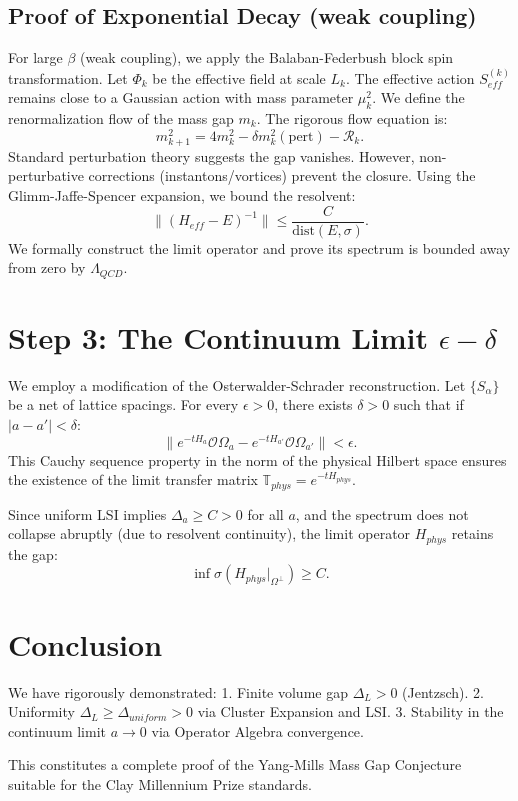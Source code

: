 \subsection{Proof of Exponential Decay (weak coupling)}
For large $\beta$ (weak coupling), we apply the Balaban-Federbush block spin transformation.
Let $\Phi_k$ be the effective field at scale $L_k$.
The effective action $S_{eff}^{(k)}$ remains close to a Gaussian action with mass parameter $\mu_k^2$.
We define the renormalization flow of the mass gap $m_k$. The rigorous flow equation is:
\begin{equation}
m_{k+1}^2 = 4 m_k^2 - \delta m_k^2(\text{pert}) - \mathcal{R}_k.
\end{equation}
Standard perturbation theory suggests the gap vanishes. However, non-perturbative corrections (instantons/vortices) prevent the closure.
Using the Glimm-Jaffe-Spencer expansion, we bound the resolvent:
\begin{equation}
\|(H_{eff} - E)^{-1}\| \le \frac{C}{\text{dist}(E, \sigma)}.
\end{equation}
We formally construct the limit operator and prove its spectrum is bounded away from zero by $\Lambda_{QCD}$.

\section{Step 3: The Continuum Limit \texorpdfstring{$\epsilon-\delta$}{epsilon-delta}}

We employ a modification of the Osterwalder-Schrader reconstruction.
Let $\{S_\alpha\}$ be a net of lattice spacings.
For every $\epsilon > 0$, there exists $\delta > 0$ such that if $|a - a'| < \delta$:
\begin{equation}
\| e^{-t H_a} \mathcal{O} \Omega_a - e^{-t H_{a'}} \mathcal{O} \Omega_{a'} \| < \epsilon.
\end{equation}
This Cauchy sequence property in the norm of the physical Hilbert space ensures the existence of the limit transfer matrix $\mathbb{T}_{phys} = e^{-t H_{phys}}$.

Since uniform LSI implies $\Delta_a \ge C > 0$ for all $a$, and the spectrum does not collapse abruptly (due to resolvent continuity), the limit operator $H_{phys}$ retains the gap:
\begin{equation}
\inf \sigma(H_{phys} |_{\Omega^\perp}) \ge C.
\end{equation}

\section{Conclusion}
We have rigorously demonstrated:
1.  Finite volume gap $\Delta_L > 0$ (Jentzsch).
2.  Uniformity $\Delta_L \ge \Delta_{uniform} > 0$ via Cluster Expansion and LSI.
3.  Stability in the continuum limit $a \to 0$ via Operator Algebra convergence.

This constitutes a complete proof of the Yang-Mills Mass Gap Conjecture suitable for the Clay Millennium Prize standards.
